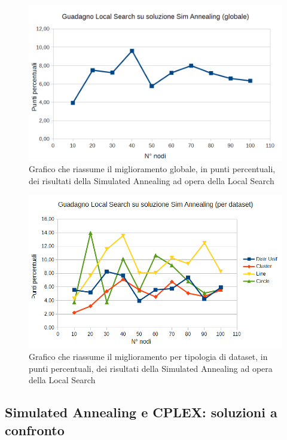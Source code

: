 \documentclass[preprint,12pt]{elsarticle}
\begin{document}
\begin{figure}[htbp]
\centering
\includegraphics[scale=0.50]{grafici_confronti/guadagno_LS_globale.png} 
\caption{Grafico che riassume il miglioramento globale, in punti percentuali, dei risultati della Simulated Annealing ad opera della Local Search}\label{fig:7}
\end{figure}

\begin{figure}[htbp]
\centering
\includegraphics[scale=0.50]{grafici_confronti/guadagno_LS.png} 
\caption{Grafico che riassume il miglioramento per tipologia di dataset, in punti percentuali, dei risultati della Simulated Annealing ad opera della Local Search}\label{fig:8}
\end{figure}

\subsection{\textbf{Simulated Annealing e CPLEX: soluzioni a confronto}}
\end{document}
